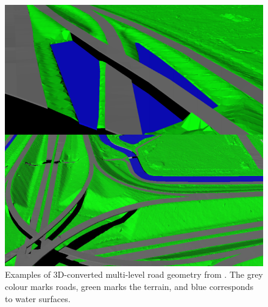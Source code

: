 \begin{figure}
    \includegraphics[width=\linewidth]{final_report/figs/oudeElberink_vosselman_2006_03.png} 
    \caption[Examples of 3D-converted multi-level road geometry]{Examples of 3D-converted multi-level road geometry from \cite{oudeElberink_vosselman_2006}. The grey colour marks roads, green marks the terrain, and blue corresponds to water surfaces.}
    \label{fig:conversionartefacts}
\end{figure}

